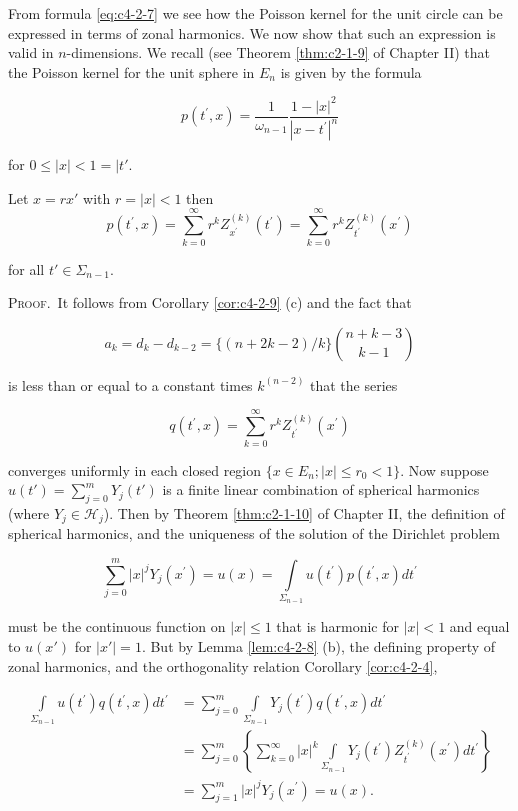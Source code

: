 From formula \eqref{eq:c4-2-7} we see how the Poisson kernel for the unit circle can be expressed in terms of zonal harmonics. We now show that such an expression is valid in $n$-dimensions. We recall (see Theorem \ref{thm:c2-1-9} of Chapter II) that the Poisson kernel for the unit sphere in $E_n$ is given by the formula

\[
p(t^{\prime},x)=\frac{1}{\omega_{n-1}}\frac{1-|x|^{2}}{|x-t^{\prime}|^{n}}
\]

for $0 \leq |x| < 1 = |t'$.

\begin{theorem}
\label{thm:c4-2-10}
Let $x = rx'$ with $r = |x| < 1$ then
\[
p(t^{\prime},x)=\sum_{k=0}^{\infty}r^{k}Z_{x^{\prime}}^{(k)}(t^{\prime})=\sum_{k=0}^{\infty}r^{k}Z_{t^{\prime}}^{(k)}(x^{\prime})
\]

for all $t' \in \Sigma_{n-1}$.
\end{theorem}

\textsc{Proof.}\ It follows from Corollary \ref{cor:c4-2-9} (c) and the fact that

\[
a_{k}=d_{k}-d_{k-2}=\{(n+2k-2)/k\}\binom{n+k-3}{k-1}
\]

is less than or equal to a constant times $k^{(n-2)}$ that the series

\[
q(t^{\prime},x)=\sum_{k=0}^{\infty}r^{k}Z_{t^{\prime}}^{(k)}(x^{\prime})
\]

converges uniformly in each closed region $\{x \in E_n; |x| \leq r_0 < 1\}$. Now suppose $u(t') = \sum_{j=0}^m Y_j(t')$ is a finite linear combination of spherical harmonics (where $Y_j \in \mathcal{H}_j$). Then by Theorem \ref{thm:c2-1-10} of Chapter II, the definition of spherical harmonics, and the uniqueness of the solution of the Dirichlet problem

\[
\sum_{j=0}^{m}|x|^{j}Y_{j}(x^{\prime})=u(x)=\int\limits_{\Sigma_{n-1}}u(t^{\prime})p(t^{\prime},x)dt^{\prime}
\]

must be the continuous function on $|x| \leq 1$ that is harmonic for $|x| < 1$ and equal to $u(x')$ for $|x'| = 1$. But by Lemma \ref{lem:c4-2-8} (b), the defining property of zonal harmonics, and the orthogonality relation Corollary \ref{cor:c4-2-4},

\[
\begin{aligned}\int\limits_{\Sigma_{n-1}}u(t^{\prime})q(t^{\prime},x)dt^{\prime}&=\sum_{j=0}^{m}\int\limits_{\Sigma_{n-1}}Y_{j}(t^{\prime})q(t^{\prime},x)dt^{\prime}\\&=\sum_{j=0}^{m}\left\{\sum_{k=0}^{\infty}|x|^{k}\int\limits_{\Sigma_{n-1}}Y_{j}(t^{\prime})Z_{t^{\prime}}^{(k)}(x^{\prime})dt^{\prime}\right\}\\&=\sum_{j=1}^{m}|x|^{j}Y_{j}(x^{\prime})=u(x).\end{aligned}
\]

